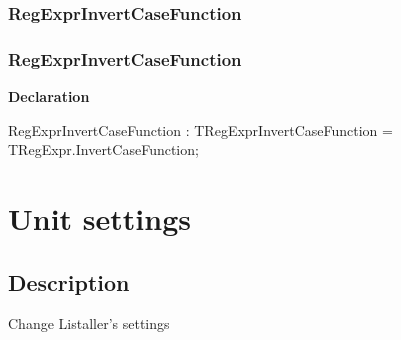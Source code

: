 \documentclass{report}
\newif\ifpdf
\begin{document}
\subsection*{\large{\textbf{RegExprInvertCaseFunction}}\normalsize\hspace{1ex}\hrulefill}
\else
\subsection*{RegExprInvertCaseFunction}
\fi
\label{RegExpr-RegExprInvertCaseFunction}
\begin{list}{}{
\setlength{\itemindent}{0cm}
\setlength{\listparindent}{0cm}
\setlength{\leftmargin}{\evensidemargin}
\addtolength{\leftmargin}{\tmplength}
\settowidth{\labelsep}{X}
\addtolength{\leftmargin}{\labelsep}
\setlength{\labelwidth}{\tmplength}
}
\item[\textbf{Declaration}\hfill]
\ifpdf
\begin{flushleft}
\fi
\begin{ttfamily}
RegExprInvertCaseFunction : TRegExprInvertCaseFunction =  TRegExpr.InvertCaseFunction;\end{ttfamily}

\ifpdf
\end{flushleft}
\fi

\end{list}
\chapter{Unit settings}
\label{settings}
\section{Description}
Change Listaller's settings
\end{document}
